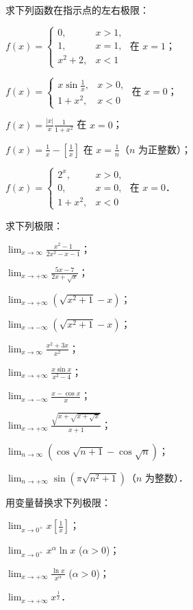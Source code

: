 \begin{xiti}
\item 求下列函数在指示点的左右极限：
\begin{ziti}
\item $f(x) = \begin{cases} 0, & x > 1, \\ 1, & x = 1, \\ x^2 + 2, & x < 1 \end{cases}$ 在 $x = 1$；
\item $f(x) = \begin{cases} x\sin\frac{1}{x}, & x > 0, \\ 1 + x^2, & x < 0 \end{cases}$ 在 $x = 0$；
\item $f(x) = \frac{|x|}{x}\frac{1}{1+x^2}$ 在 $x = 0$；
\item $f(x) = \frac{1}{x} - \left[\frac{1}{x}\right]$ 在 $x = \frac{1}{n}$（$n$ 为正整数）；
\item $f(x) = \begin{cases} 2^x, & x > 0, \\ 0, & x = 0, \\ 1 + x^2, & x < 0 \end{cases}$ 在 $x = 0$．
\end{ziti}

\item 求下列极限：
\begin{ziti}
\item $\lim_{x \to \infty} \frac{x^2 - 1}{2x^2 - x - 1}$；
\item $\lim_{x \to +\infty} \frac{5x - 7}{2x + \sqrt{x}}$；
\item $\lim_{x \to +\infty} (\sqrt{x^2 + 1} - x)$；
\item $\lim_{x \to -\infty} (\sqrt{x^2 + 1} - x)$；
\item $\lim_{x \to \infty} \frac{x^2 + 3x}{x^2}$；
\item $\lim_{x \to +\infty} \frac{x\sin x}{x^2 - 4}$；
\item $\lim_{x \to -\infty} \frac{x - \cos x}{x}$；
\item $\lim_{x \to +\infty} \frac{\sqrt{x + \sqrt{x + \sqrt{x}}}}{x + 1}$；
\item $\lim_{n \to \infty} (\cos\sqrt{n+1} - \cos\sqrt{n})$；
\item $\lim_{n \to +\infty} \sin(\pi\sqrt{n^2 + 1})$（$n$ 为整数）．
\end{ziti}

\item 用变量替换求下列极限：
\begin{ziti}
\item $\lim_{x \to 0^+} x \left[\frac{1}{x}\right]$；
\item $\lim_{x \to 0^+} x^\alpha \ln x$ ($\alpha > 0$)；
\item $\lim_{x \to +\infty} \frac{\ln x}{x^\alpha}$ ($\alpha > 0$)；
\item $\lim_{x \to +\infty} x^{\frac{1}{x}}$．
\end{ziti}


\end{xiti}
